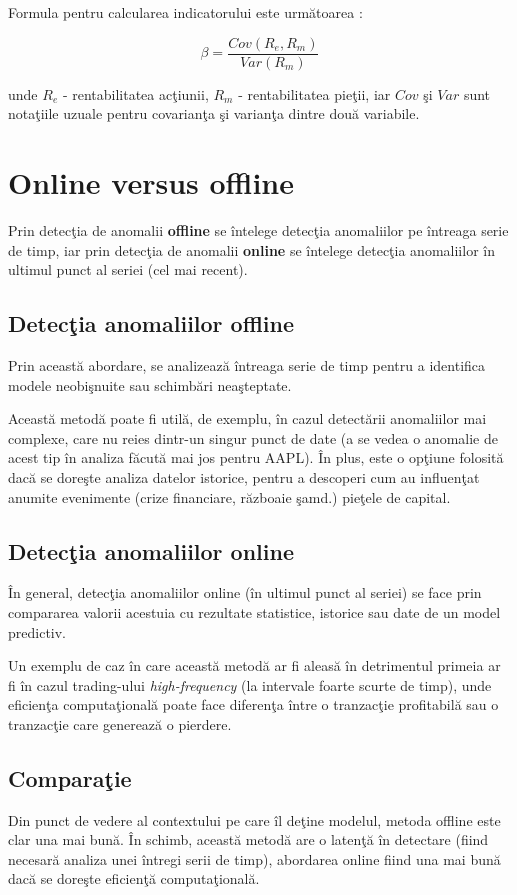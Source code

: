 Formula pentru calcularea indicatorului este urm\u atoarea \cite{investopedia_beta}:

$$ \beta = \frac{Cov(R_e, R_m)}{Var(R_m)}$$

unde $R_e$ - rentabilitatea ac\c tiunii, $R_m$ - rentabilitatea pie\c tii, iar $Cov$ \c si $Var$ sunt nota\c tiile uzuale pentru covarian\c ta \c si varian\c ta dintre dou\u a variabile. 

\section{Online versus offline}

Prin detec\c tia de anomalii \textbf{offline} se \^ intelege detec\c tia anomaliilor pe \^ intreaga serie de timp, iar prin detec\c tia de anomalii \textbf{online} se \^ intelege detec\c tia anomaliilor \^ in ultimul punct al seriei (cel mai recent). 

\subsection {Detec\c tia anomaliilor offline}

Prin aceast\u a abordare, se analizeaz\u a \^ intreaga serie de timp pentru a identifica modele neobi\c snuite sau schimb\u ari nea\c steptate. 

Aceast\u a metod\u a poate fi util\u a, de exemplu, \^ in cazul detect\u arii anomaliilor mai complexe, care nu reies dintr-un singur punct de date (a se vedea o anomalie de acest tip \^ in analiza f\u acut\u a mai jos pentru AAPL). \^ In plus, este o op\c tiune folosit\u a dac\u a se dore\c ste analiza datelor istorice, pentru a descoperi cum au influen\c tat anumite evenimente (crize financiare, r\u azboaie \c samd.) pie\c tele de capital. 

\subsection {Detec\c tia anomaliilor online}

\^ In general, detec\c tia anomaliilor online (\^ in ultimul punct al seriei) se face prin compararea valorii acestuia cu rezultate statistice, istorice sau date de un model predictiv. 

Un exemplu de caz \^ in care aceast\u a metod\u a ar fi aleas\u a \^ in detrimentul primeia ar fi \^ in cazul trading-ului \textit{high-frequency} (la intervale foarte scurte de timp), unde eficien\c ta computa\c tional\u a poate face diferen\c ta \^ intre o tranzac\c tie profitabil\u a sau o tranzac\c tie care genereaz\u a o pierdere. 

\subsection {Compara\c tie}

Din punct de vedere al contextului pe care \^ il de\c tine modelul, metoda offline este clar una mai bun\u a. \^ In schimb, aceast\u a metod\u a are o laten\c t\u a \^ in detectare (fiind necesar\u a analiza unei \^ intregi serii de timp), abordarea online fiind una mai bun\u a dac\u a se dore\c ste eficien\c t\u a computa\c tional\u a.